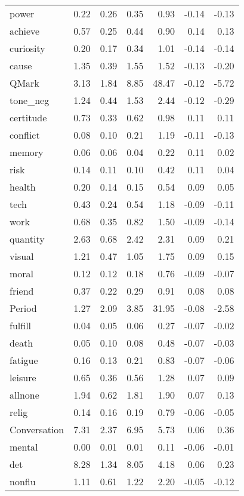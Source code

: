 \begin{longtable}{@{}p{3.4cm}rrrrrr@{}}
power & 0.22 & 0.26 & 0.35 & 0.93 & -0.14 & -0.13 \\
achieve & 0.57 & 0.25 & 0.44 & 0.90 & 0.14 & 0.13 \\
curiosity & 0.20 & 0.17 & 0.34 & 1.01 & -0.14 & -0.14 \\
cause & 1.35 & 0.39 & 1.55 & 1.52 & -0.13 & -0.20 \\
QMark & 3.13 & 1.84 & 8.85 & 48.47 & -0.12 & -5.72 \\
tone\_neg & 1.24 & 0.44 & 1.53 & 2.44 & -0.12 & -0.29 \\
certitude & 0.73 & 0.33 & 0.62 & 0.98 & 0.11 & 0.11 \\
conflict & 0.08 & 0.10 & 0.21 & 1.19 & -0.11 & -0.13 \\
memory & 0.06 & 0.06 & 0.04 & 0.22 & 0.11 & 0.02 \\
risk & 0.14 & 0.11 & 0.10 & 0.42 & 0.11 & 0.04 \\
health & 0.20 & 0.14 & 0.15 & 0.54 & 0.09 & 0.05 \\
tech & 0.43 & 0.24 & 0.54 & 1.18 & -0.09 & -0.11 \\
work & 0.68 & 0.35 & 0.82 & 1.50 & -0.09 & -0.14 \\
quantity & 2.63 & 0.68 & 2.42 & 2.31 & 0.09 & 0.21 \\
visual & 1.21 & 0.47 & 1.05 & 1.75 & 0.09 & 0.15 \\
moral & 0.12 & 0.12 & 0.18 & 0.76 & -0.09 & -0.07 \\
friend & 0.37 & 0.22 & 0.29 & 0.91 & 0.08 & 0.08 \\
Period & 1.27 & 2.09 & 3.85 & 31.95 & -0.08 & -2.58 \\
fulfill & 0.04 & 0.05 & 0.06 & 0.27 & -0.07 & -0.02 \\
death & 0.05 & 0.10 & 0.08 & 0.48 & -0.07 & -0.03 \\
fatigue & 0.16 & 0.13 & 0.21 & 0.83 & -0.07 & -0.06 \\
leisure & 0.65 & 0.36 & 0.56 & 1.28 & 0.07 & 0.09 \\
allnone & 1.94 & 0.62 & 1.81 & 1.90 & 0.07 & 0.13 \\
relig & 0.14 & 0.16 & 0.19 & 0.79 & -0.06 & -0.05 \\
Conversation & 7.31 & 2.37 & 6.95 & 5.73 & 0.06 & 0.36 \\
mental & 0.00 & 0.01 & 0.01 & 0.11 & -0.06 & -0.01 \\
det & 8.28 & 1.34 & 8.05 & 4.18 & 0.06 & 0.23 \\
nonflu & 1.11 & 0.61 & 1.22 & 2.20 & -0.05 & -0.12 \\

\end{longtable}
